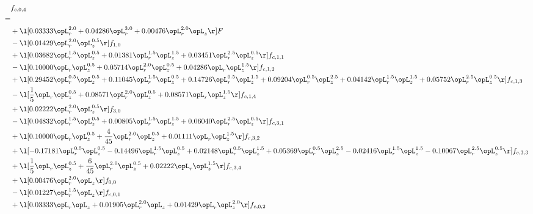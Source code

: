 \begin{alignat}{2} 
\label{eq:f_04_1} 
& f_{c,0,4} \nonumber \\ 
 = \\ 
& + \l[  0.03333 \opL_r^{2.0} +  0.04286 \opL_r^{3.0} +  0.00476 \opL_r^{2.0} \opL_z  \r] F \nonumber \\ 
& - \l[  0.01429 \opL_r^{2.0} \opL_z^{0.5}  \r] f_{1,0} \nonumber \\ 
& + \l[  0.03682 \opL_r^{1.5} \opL_z^{0.5} +  0.01381 \opL_r^{1.5} \opL_z^{1.5} +  0.03451 \opL_r^{2.5} \opL_z^{0.5}  \r] f_{c,1,1} \nonumber \\ 
& - \l[  0.10000 \opL_r \opL_z^{0.5} +  0.05714 \opL_r^{2.0} \opL_z^{0.5} +  0.04286 \opL_r \opL_z^{1.5}  \r] f_{c,1,2} \nonumber \\ 
& + \l[  0.29452 \opL_r^{0.5} \opL_z^{0.5} +  0.11045 \opL_r^{1.5} \opL_z^{0.5} +  0.14726 \opL_r^{0.5} \opL_z^{1.5} +  0.09204 \opL_r^{0.5} \opL_z^{2.5} +  0.04142 \opL_r^{1.5} \opL_z^{1.5} +  0.05752 \opL_r^{2.5} \opL_z^{0.5}  \r] f_{c,1,3} \nonumber \\ 
& - \l[ \frac{1}{5} \opL_r \opL_z^{0.5} +  0.08571 \opL_r^{2.0} \opL_z^{0.5} +  0.08571 \opL_r \opL_z^{1.5}  \r] f_{c,1,4} \nonumber \\ 
& + \l[  0.02222 \opL_r^{2.0} \opL_z^{0.5}  \r] f_{3,0} \nonumber \\ 
& - \l[  0.04832 \opL_r^{1.5} \opL_z^{0.5} +  0.00805 \opL_r^{1.5} \opL_z^{1.5} +  0.06040 \opL_r^{2.5} \opL_z^{0.5}  \r] f_{c,3,1} \nonumber \\ 
& + \l[  0.10000 \opL_r \opL_z^{0.5} + \frac{4}{45} \opL_r^{2.0} \opL_z^{0.5} +  0.01111 \opL_r \opL_z^{1.5}  \r] f_{c,3,2} \nonumber \\ 
& + \l[  -0.17181 \opL_r^{0.5} \opL_z^{0.5}   -0.14496 \opL_r^{1.5} \opL_z^{0.5} +  0.02148 \opL_r^{0.5} \opL_z^{1.5} +  0.05369 \opL_r^{0.5} \opL_z^{2.5}   -0.02416 \opL_r^{1.5} \opL_z^{1.5}   -0.10067 \opL_r^{2.5} \opL_z^{0.5}  \r] f_{c,3,3} \nonumber \\ 
& + \l[ \frac{1}{5} \opL_r \opL_z^{0.5} + \frac{6}{45} \opL_r^{2.0} \opL_z^{0.5} +  0.02222 \opL_r \opL_z^{1.5}  \r] f_{c,3,4} \nonumber \\ 
& + \l[  0.00476 \opL_r^{2.0} \opL_z  \r] f_{0,0} \nonumber \\ 
& - \l[  0.01227 \opL_r^{1.5} \opL_z  \r] f_{c,0,1} \nonumber \\ 
& + \l[  0.03333 \opL_r \opL_z +  0.01905 \opL_r^{2.0} \opL_z +  0.01429 \opL_r \opL_z^{2.0}  \r] f_{c,0,2} \nonumber \\ 

\end{alignat}

